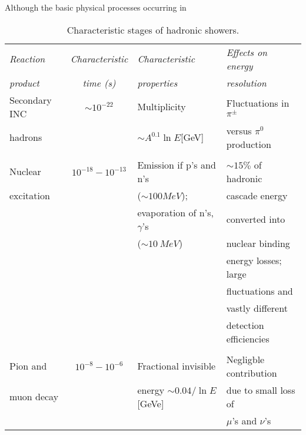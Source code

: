  \label{sec:cascades}

Although the basic physical processes occurring in 


\begin{table}[!hbt]
\caption{Characteristic stages of hadronic showers.}

\hspace{0.5cm}

\label{taul:hetcCharacteristics} %
\centering
\begin{tabular}{lcll}
\hline
\em Reaction     & \em Characteristic  & \em Characteristic             & \em Effects on energy      \\
\em product      & \em time (s)        & \em properties                 & \em resolution             \\[2.5ex] 
\hline
    Secondary INC& $\sim 10^{-22}$     & Multiplicity                   & Fluctuations in $\pi^\pm$  \\
    hadrons      &                     & $\sim A^{0.1} \ln E$[GeV]      & versus  $\pi^0$ production \\
                 &                     &                                &                            \\
    Nuclear      & $10^{-18}-10^{-13}$ & Emission if p's and n's        & $\sim 15 \%$ of hadronic   \\
    excitation   &                     & ($\sim 100 MeV$);              & cascade energy             \\
                 &                     & evaporation of n's, $\gamma$'s & converted into             \\
                 &                     & ($\sim 10~MeV$)                & nuclear binding            \\
                 &                     &                                & energy losses; large       \\
                 &                     &                                & fluctuations and           \\
                 &                     &                                & vastly different           \\
                 &                     &                                & detection efficiencies     \\
                 &                     &                                &                            \\
Pion and         & $10^{-8}-10^{-6}$   & Fractional invisible           & Negligble contribution     \\
muon decay       &                     & energy $\sim 0.04/\ln E$[GeVe]  & due to small loss of       \\
                 &                     &                                & $\mu$'s and $\nu$'s        \\
\hline
\end{tabular} 
\end{table}


